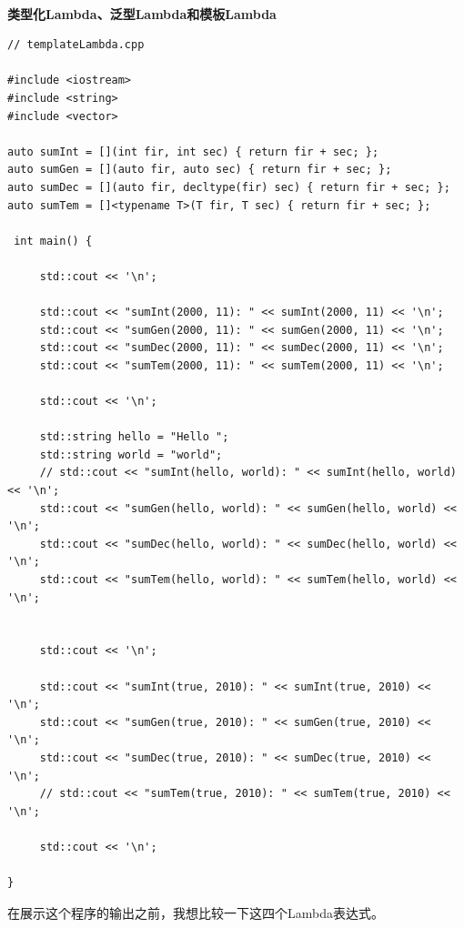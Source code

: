 \hspace*{\fill} \\ %
\noindent
\textbf{类型化Lambda、泛型Lambda和模板Lambda}
\begin{lstlisting}[style=styleCXX]
// templateLambda.cpp

#include <iostream>
#include <string>
#include <vector>

auto sumInt = [](int fir, int sec) { return fir + sec; };
auto sumGen = [](auto fir, auto sec) { return fir + sec; };
auto sumDec = [](auto fir, decltype(fir) sec) { return fir + sec; };
auto sumTem = []<typename T>(T fir, T sec) { return fir + sec; };

 int main() {
	
	 std::cout << '\n';
	
	 std::cout << "sumInt(2000, 11): " << sumInt(2000, 11) << '\n';
	 std::cout << "sumGen(2000, 11): " << sumGen(2000, 11) << '\n';
	 std::cout << "sumDec(2000, 11): " << sumDec(2000, 11) << '\n';
	 std::cout << "sumTem(2000, 11): " << sumTem(2000, 11) << '\n';
	
	 std::cout << '\n';
	
	 std::string hello = "Hello ";
	 std::string world = "world";
	 // std::cout << "sumInt(hello, world): " << sumInt(hello, world) << '\n';
	 std::cout << "sumGen(hello, world): " << sumGen(hello, world) << '\n';
	 std::cout << "sumDec(hello, world): " << sumDec(hello, world) << '\n';
	 std::cout << "sumTem(hello, world): " << sumTem(hello, world) << '\n';
	
	
	 std::cout << '\n';
	
	 std::cout << "sumInt(true, 2010): " << sumInt(true, 2010) << '\n';
	 std::cout << "sumGen(true, 2010): " << sumGen(true, 2010) << '\n';
	 std::cout << "sumDec(true, 2010): " << sumDec(true, 2010) << '\n';
	 // std::cout << "sumTem(true, 2010): " << sumTem(true, 2010) << '\n';
	
	 std::cout << '\n';
	
}
\end{lstlisting}

在展示这个程序的输出之前，我想比较一下这四个Lambda表达式。

